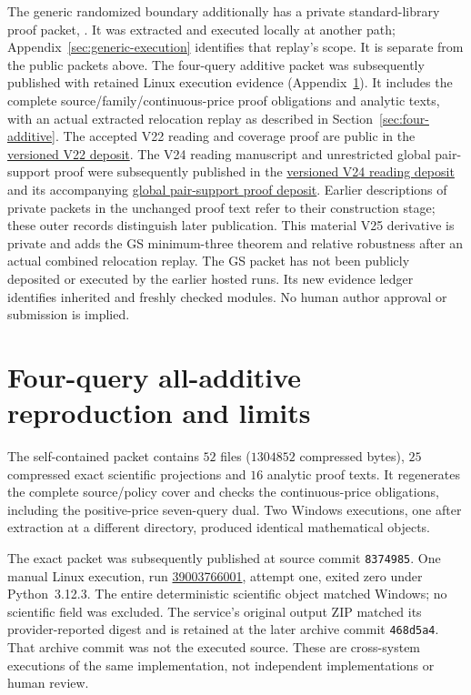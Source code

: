 \documentclass[pdflatex,sn-mathphys-num]{sn-jnl}
\theoremstyle{thmstyleone}
\theoremstyle{thmstylethree}
\theoremstyle{thmstyletwo}
\begin{document}
The generic randomized boundary additionally has a private standard-library proof packet, . It was extracted and executed locally at another path; Appendix~\ref{sec:generic-execution} identifies that replay's scope. It is separate from the public packets above. The four-query additive packet  was subsequently published with retained Linux execution evidence (Appendix~\ref{app:four-additive-replay}). It includes the complete source/family/continuous-price proof obligations and analytic texts, with an actual extracted relocation replay as described in Section~\ref{sec:four-additive}. The accepted V22 reading and coverage proof are public in the
\href{https://github.com/SHiJiE1115/newproj/tree/5df6889dca8928d6a676da980e6ceb9b2ba515d3/manuscript/journal_v22_reading}{versioned V22 deposit}.
The V24 reading manuscript and unrestricted global pair-support
proof were subsequently published in the
\href{https://github.com/SHiJiE1115/newproj/tree/25e66d4ccd8e73e2b4fcda80ef535eb5043ad039/manuscript/journal_v24_reading}{versioned V24 reading deposit}
and its accompanying
\href{https://github.com/SHiJiE1115/newproj/tree/25e66d4ccd8e73e2b4fcda80ef535eb5043ad039/theory/global_four_query_pair_minimum2_v01}{global pair-support proof deposit}.
Earlier descriptions of private packets in the unchanged proof text
refer to their construction stage; these outer records distinguish
later publication. This material V25 derivative is private and adds
the GS minimum-three theorem and relative robustness after an actual
combined relocation replay. The GS packet has not been publicly
deposited or executed by the earlier hosted runs. Its new evidence
ledger identifies inherited and freshly checked modules. No human
author approval or submission is implied.

\section{Four-query all-additive reproduction and limits}
\label{app:four-additive-replay}
The self-contained packet  contains $52$
files ($1304852$ compressed bytes), $25$ compressed exact scientific
projections and $16$ analytic proof texts. It regenerates the complete
source/policy cover and checks the continuous-price obligations, including
the positive-price seven-query dual. Two Windows executions, one after
extraction at a different directory, produced identical mathematical objects.

The exact packet was subsequently published at source commit
\texttt{8374985}. One manual Linux execution, run
\href{https://github.com/SHiJiE1115/newproj/actions/runs/39003766001}{39003766001},
attempt one, exited zero under Python~3.12.3. The entire deterministic
scientific object matched Windows; no scientific field was excluded.
The service's original output ZIP matched its provider-reported digest
and is retained at the later archive commit \texttt{468d5a4}. That archive
commit was not the executed source. These are cross-system executions
of the same implementation, not independent implementations or human review.
\end{document}
